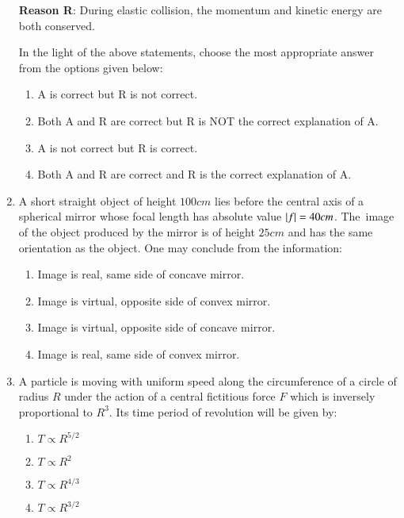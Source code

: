 \documentclass[journal]{IEEEtran}
\begin{document}
\begin{enumerate}
    \textbf{Reason R}: During elastic collision, the momentum and kinetic energy are
    both conserved.
    
    In the light of the above statements, choose the most appropriate answer from the
    options given below:

    \begin{enumerate}
        \item A is correct but R is not correct.
        \item Both A and R are correct but R is NOT the correct explanation of A.
        \item A is not correct but R is correct.
        \item Both A and R are correct and R is the correct explanation of A.
    \end{enumerate}

    \item A short straight object of height $100 cm$ lies before the central axis of
    a spherical mirror whose focal length has absolute value $\left\vert f\right\vert = 40 cm$. The\
    image of the object produced by the mirror is of height $25 cm$ and has the same
    orientation as the object. One may conclude from the information:

    \begin{enumerate}
        \item Image is real, same side of concave mirror.
        \item Image is virtual, opposite side of convex mirror.
        \item Image is virtual, opposite side of concave mirror.
        \item Image is real, same side of convex mirror.
    \end{enumerate}

    \item A particle is moving with uniform speed along the circumference of a circle
    of radius $R$ under the action of a central fictitious force $F$ which is
    inversely proportional to $R^3$. Its time period of revolution will be given by:

    \begin{multicols}{4}
    \begin{enumerate}
        \item $T \propto R^{5/2}$
        \item $T \propto R^2$
        \item $T \propto R^{4/3}$
        \item $T \propto R^{3/2}$
    \end{enumerate}
    \end{multicols} 

\end{enumerate}
\end{document}
